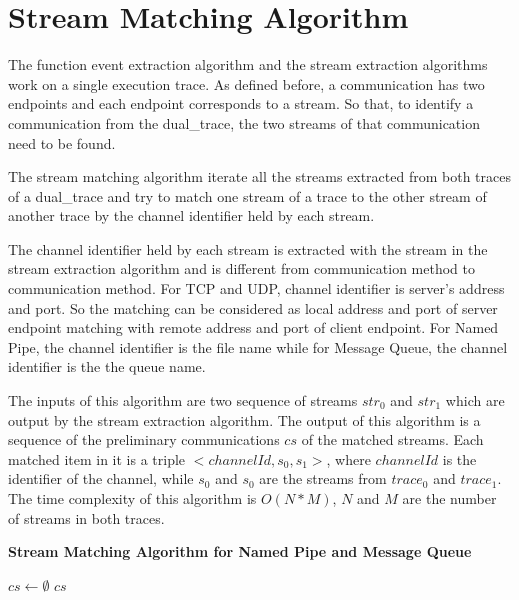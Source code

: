\section{Stream Matching Algorithm}\label{streammatch}
The function event extraction algorithm and the stream extraction algorithms work on a single execution trace. As defined before, a communication has two endpoints and each endpoint corresponds to a stream. So that, to identify a communication from the dual\_trace, the two streams of that communication need to be found. 

The stream matching algorithm iterate all the streams extracted from both traces of a dual\_trace and try to match one stream of a trace to the other stream of another trace by the channel identifier held by each stream.

The channel identifier held by each stream is extracted with the stream in the stream extraction algorithm and is different from communication method to communication method. For TCP and UDP, channel identifier is server's address and port. So the matching can be considered as local address and port of server endpoint matching with remote address and port of client endpoint. For Named Pipe, the channel identifier is the file name while for Message Queue, the channel identifier is the the queue name. 

 The inputs of this algorithm are two sequence of streams $str_0$ and $str_1$ which are output by the stream extraction algorithm. The output of this algorithm is a sequence of the preliminary communications $cs$ of the matched streams. Each matched item in it is a triple $<channelId, s_0, s_1>$, where $channelId$ is the identifier of the channel, while $s_0$ and $s_0$ are the streams from $trace_0$ and $trace_1$.  The time complexity of this algorithm is $O(N*M)$, $N$ and $M$ are the number of streams in both traces.
 
 \begin{algorithm}[H]
\DontPrintSemicolon
\caption{{\bf Stream Matching Algorithm for Named Pipe and Message Queue} \label{matchAlg}}
$cs \leftarrow \emptyset$\; 
\KwRet $cs$\;
\end{algorithm} 


